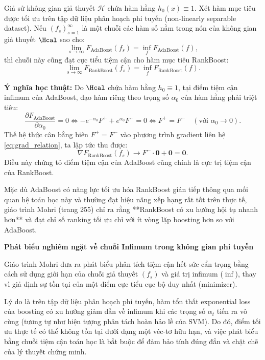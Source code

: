\begin{tcolorbox}[colback=blue!5, colframe=blue!50!black, title={\textbf{Mối liên hệ học thuật AdaBoost $\leftrightarrow$ RankBoost}}]
Giả sử không gian giả thuyết $\mathcal{H}$ chứa hàm hằng $h_0(x) \equiv 1$. Xét hàm mục tiêu được tối ưu trên tập dữ liệu phân hoạch phi tuyến (non-linearly separable dataset). 
Nếu $(f_s)_{s=1}^\infty$ là một chuỗi các hàm số nằm trong nón của không gian giả thuyết $\Hcal$ sao cho:
\begin{equation}
    \lim_{s \to \infty} F_{\text{AdaBoost}}(f_s) = \inf_{f} F_{\text{AdaBoost}}(f),
\end{equation}
thì chuỗi này cũng đạt cực tiểu tiệm cận cho hàm mục tiêu RankBoost:
\begin{equation}
    \lim_{s \to \infty} F_{\text{RankBoost}}(f_s) = \inf_{f} F_{\text{RankBoost}}(f).
\end{equation}

\textbf{Ý nghĩa học thuật:}
Do $\Hcal$ chứa hàm hằng $h_0 \equiv 1$, tại điểm tiệm cận infimum của AdaBoost, đạo hàm riêng theo trọng số $\alpha_0$ của hàm hằng phải triệt tiêu:
\[
    \frac{\partial F_{\text{AdaBoost}}}{\partial \alpha_0} = 0 \iff -e^{-\alpha_0} F^+ + e^{\alpha_0} F^- = 0 \iff F^+ = F^- \quad (\text{với } \alpha_0 \to 0).
\]
Thế hệ thức cân bằng biên $F^+ = F^-$ vào phương trình gradient liên hệ \eqref{eq:grad_relation}, ta lập tức thu được:
\[
    \nabla F_{\text{RankBoost}}(f_s) \to F^- \cdot \bm{0} + \bm{0} = \bm{0}.
\]
Điều này chứng tỏ điểm tiệm cận của AdaBoost cũng chính là cực trị tiệm cận của RankBoost.

Mặc dù AdaBoost có năng lực tối ưu hóa RankBoost gián tiếp thông qua mối quan hệ toán học này và thường đạt hiệu năng xếp hạng rất tốt trên thực tế, giáo trình Mohri (trang 255) chỉ ra rằng **RankBoost có xu hướng hội tụ nhanh hơn** và đạt chỉ số ranking tối ưu chỉ với ít vòng lặp boosting hơn so với AdaBoost.
\end{tcolorbox}

\begin{extension}
\textbf{Phát biểu nghiêm ngặt về chuỗi Infimum trong không gian phi tuyến}

Giáo trình Mohri đưa ra phát biểu phân tích tiệm cận hết sức cẩn trọng bằng cách sử dụng giới hạn của chuỗi giả thuyết $(f_s)$ và giá trị infimum ($\inf$), thay vì giả định sự tồn tại của một điểm cực tiểu cục bộ duy nhất (minimizer). 

Lý do là trên tập dữ liệu phân hoạch phi tuyến, hàm tổn thất exponential loss của boosting có xu hướng giảm dần về infimum khi các trọng số $\alpha_t$ tiến ra vô cùng (tương tự như hiện tượng phân tách hoàn hảo lề của SVM). Do đó, điểm tối ưu thực tế có thể không tồn tại dưới dạng một véc-tơ hữu hạn, và việc phát biểu bằng chuỗi tiệm cận toán học là bắt buộc để đảm bảo tính đúng đắn và chặt chẽ của lý thuyết chứng minh.
\end{extension}


